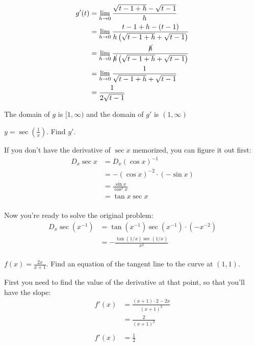 \documentclass[fleqn,addpoints]{exam}
\begin{document}
\begin{questions}
\begin{solution}
\begin{align*}
  g'(t) &= \lim_{h \to 0} \frac{\sqrt{t - 1 + h} - \sqrt{t - 1}}{h} \\
  &= \lim_{h \to 0} \frac{t - 1 + h - (t - 1)}{h \left( \sqrt{t - 1 + h} + \sqrt{t - 1} \right)} \\
  &= \lim_{h \to 0} \frac{\cancel{h}}{\cancel{h} \left( \sqrt{t - 1 + h} + \sqrt{t - 1} \right)} \\
  &= \lim_{h \to 0} \frac{1}{\sqrt{t - 1 + h} + \sqrt{t - 1}} \\
  &= \frac{1}{2 \sqrt{t - 1}} \\
\end{align*}

The domain of $g$ is $[1, \infty)$ and the domain of $g'$ is $(1, \infty)$

\end{solution}

\ifprintanswers
\pagebreak
\fi

\question
$y = \sec \left( \frac{1}{x} \right)$.  Find $y'$.

\begin{solution}

If you don't have the derivative of $\sec x$ memorized, you can figure it out first:
\begin{align*}
  D_x \sec x &= D_x ( \cos x )^{-1} \\
  &= - (\cos x)^{-2} \cdot (- \sin x) \\
  &= \frac{\sin x}{\cos^2 x} \\
  &= \tan x \sec x \\
\end{align*}

Now you're ready to solve the original problem:
\begin{align*}
  D_x \sec ( x^{-1} ) &= \tan (x^{-1}) \sec (x^{-1}) \cdot (-x^{-2}) \\
  &= - \frac{\tan (1/x) \sec(1/x)}{x^2} \\
\end{align*}

\end{solution}

\question $f(x)= \frac{2x}{x+1}$.  Find an equation of the tangent line to the curve at $(1, 1)$.

\begin{solution}
First you need to find the value of the derivative at that point, so that you'll have the slope:
\begin{align*}
  f'(x) &= \frac{(x + 1) \cdot 2 - 2x}{(x + 1)^2} \\
  &= \frac{2}{(x + 1)^2} \\
\\
  f'(x) &= \frac{1}{2} \\
\end{align*}


\end{solution}
\end{questions}
\end{document}
